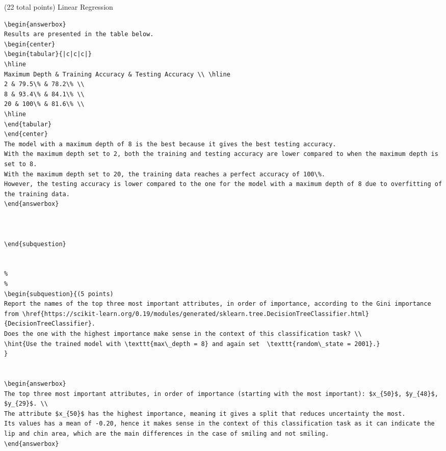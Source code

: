 \documentclass[12pt]{article}
\begin{document}
\begin{question}{(22 total points) Linear Regression}
\begin{subquestion}
\begin{answerbox}{20em}
\begin {verbatim}
\begin{answerbox}{20em}
Results are presented in the table below.
\begin{center}
\begin{tabular}{|c|c|c|}
\hline
Maximum Depth & Training Accuracy & Testing Accuracy \\ \hline
2 & 79.5\% & 78.2\% \\
8 & 93.4\% & 84.1\% \\
20 & 100\% & 81.6\% \\
\hline
\end{tabular}
\end{center}
The model with a maximum depth of 8 is the best because it gives the best testing accuracy.
With the maximum depth set to 2, both the training and testing accuracy are lower compared to when the maximum depth is set to 8. 
With the maximum depth set to 20, the training data reaches a perfect accuracy of 100\%. 
However, the testing accuracy is lower compared to the one for the model with a maximum depth of 8 due to overfitting of the training data.
\end{answerbox}



\end{subquestion}


%
%
\begin{subquestion}{(5 points) 
Report the names of the top three most important attributes, in order of importance, according to the Gini importance from \href{https://scikit-learn.org/0.19/modules/generated/sklearn.tree.DecisionTreeClassifier.html}{DecisionTreeClassifier}. 
Does the one with the highest importance make sense in the context of this classification task? \\
\hint{Use the trained model with \texttt{max\_depth = 8} and again set  \texttt{random\_state = 2001}.}
}


\begin{answerbox}{10em}
The top three most important attributes, in order of importance (starting with the most important): $x_{50}$, $y_{48}$, $y_{29}$. \\
The attribute $x_{50}$ has the highest importance, meaning it gives a split that reduces uncertainty the most.
Its values has a mean of -0.20, hence it makes sense in the context of this classification task as it can indicate the lip and chin area, which are the main differences in the case of smiling and not smiling.
\end{answerbox}




\end{verbatim}
\end{answerbox}
\end{subquestion}
\end{question}
\end{document}
